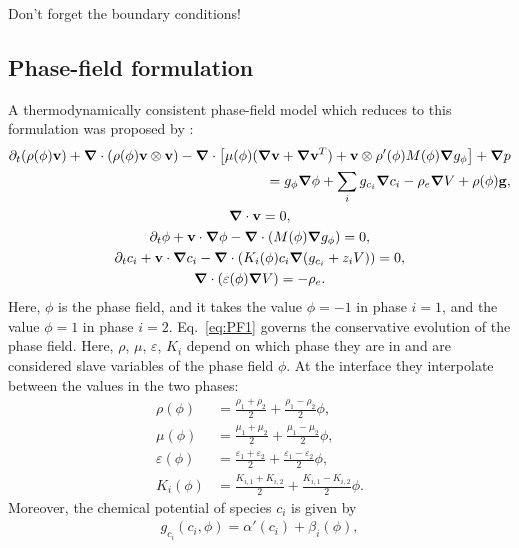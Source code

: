 \documentclass[preprint,pre,superscriptaddress,a4paper]{revtex4-1}
\renewcommand{\v}[1]{\ensuremath{\mathbf{#1}}} %
\newcommand{\gv}[1]{\ensuremath{\mbox{\boldmath$ #1 $}}}
\newcommand{\grad}[1]{\gv{\nabla} #1} %
\renewcommand{\div}[1]{\gv{\nabla} \cdot #1} %
\newcommand{\pdt}[1]{\partial_t #1}
\begin{document}
Don't forget the boundary conditions!

\subsection{Phase-field formulation}
A thermodynamically consistent phase-field model which reduces to this formulation was proposed by \cite{campillo-funollet2012}:
\begin{gather}
  \begin{split}
    \pdt (\rho (\phi) \v v) + \div \left( \rho(\phi) \v v \otimes \v v \right) - \div \left[ \mu (\phi) (\grad \v v + \grad \v v ^T) + \v v \otimes \rho'(\phi) M(\phi) \grad g_\phi \right] + \grad p\\
    = g_\phi \grad \phi + \sum_i g_{c_i} \grad c_i - \rho_e \grad V + \rho(\phi) \v g,
  \end{split} \label{eq:PF_NS1}\\
  \div \v v = 0, \\
  \pdt \phi + \v v \cdot \grad \phi - \div(M(\phi) \grad g_\phi ) = 0, \label{eq:PF1}\\
  \pdt c_i + \v v \cdot \grad c_i - \div ( K_i (\phi) c_i \grad (g_{c_i} + z_i V )) = 0, \\
  \div ( \varepsilon (\phi) \grad V ) = - \rho_e.
\end{gather}
Here, $\phi$ is the phase field, and it takes the value $\phi=-1$ in phase $i=1$, and the value $\phi=1$ in phase $i=2$.
Eq.~\eqref{eq:PF1} governs the conservative evolution of the phase field.
Here, $\rho$, $\mu$, $\varepsilon$, $K_i$ depend on which phase they are in and are considered slave variables of the phase field $\phi$.
At the interface they interpolate between the values in the two phases:
\begin{align}
  \rho (\phi) &= \frac{\rho_1 + \rho_2}{2} + \frac{\rho_1 - \rho_2}{2} \phi, \\
  \mu (\phi ) &= \frac{\mu_1 + \mu_2}{2} + \frac{\mu_1 - \mu_2}{2} \phi, \\
  \varepsilon (\phi) &= \frac{\varepsilon_1 + \varepsilon_2}{2} + \frac{\varepsilon_1 - \varepsilon_2}{2} \phi, \\
  K_i (\phi) &= \frac{K_{i,1} + K_{i,2}}{2} + \frac{K_{i,1} - K_{i,2}}{2} \phi.
\end{align}
Moreover, the chemical potential of species $c_i$ is given by
\begin{align}
  g_{c_i}(c_i, \phi) = \alpha'(c_i) + \beta_i (\phi),
  \label{eq:PF_chempot}
\end{align}
\end{document}

